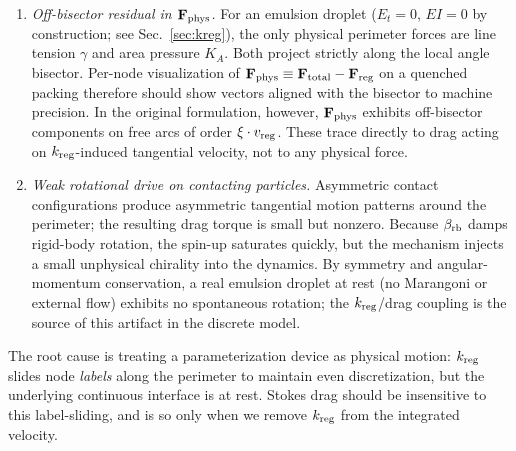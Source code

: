 \documentclass[aps,pre,twocolumn,floatfix,longbibliography]{revtex4-2}
\begin{document}
\begin{enumerate}
\item \emph{Off-bisector residual in $\mathbf{F}_{\rm phys}$.} For an
emulsion droplet ($E_t = 0$, $EI = 0$ by construction; see
Sec.~\ref{sec:kreg}), the only physical perimeter forces are line tension
$\gamma$ and area pressure $K_A$. Both project strictly along the local
angle bisector. Per-node visualization of
$\mathbf{F}_{\rm phys} \equiv \mathbf{F}_{\rm total} - \mathbf{F}_{\rm reg}$
on a quenched packing therefore should show vectors aligned with the
bisector to machine precision. In the original formulation, however,
$\mathbf{F}_{\rm phys}$ exhibits off-bisector components on free arcs of
order $\xi \cdot v_{\rm reg}$. These trace directly to drag acting on
$k_{\rm reg}$-induced tangential velocity, not to any physical force.

\item \emph{Weak rotational drive on contacting particles.}
Asymmetric contact configurations produce asymmetric tangential motion
patterns around the perimeter; the resulting drag torque is small but
nonzero. Because $\beta_{\rm rb}$ damps rigid-body rotation, the spin-up
saturates quickly, but the mechanism injects a small unphysical
chirality into the dynamics. By symmetry and angular-momentum
conservation, a real emulsion droplet at rest (no Marangoni or external
flow) exhibits no spontaneous rotation; the $k_{\rm reg}$/drag coupling
is the source of this artifact in the discrete model.
\end{enumerate}

The root cause is treating a parameterization device as physical motion:
$k_{\rm reg}$ slides node \emph{labels} along the perimeter to maintain
even discretization, but the underlying continuous interface is at rest.
Stokes drag should be insensitive to this label-sliding, and is so only
when we remove $k_{\rm reg}$ from the integrated velocity.
\end{document}
